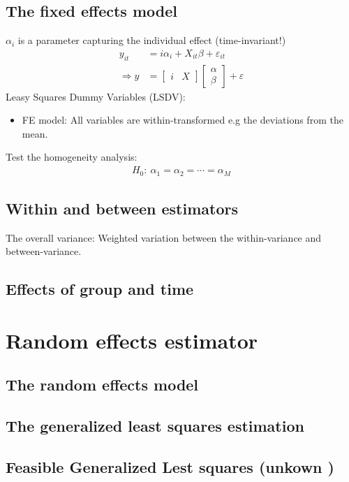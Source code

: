 \begin{multicols}{2}
 \subsection{The fixed effects model}
 $\alpha_i$ is a parameter capturing the individual effect (time-invariant!)
 \begin{align*}
  y_{it}        & =i\alpha_i+X_{it}\beta+\varepsilon_{it}                                            \\
  \Rightarrow y & = [\begin{array}{cc}i & X\end{array}] \left[\begin{array}{c}\alpha \\ \beta\end{array}\right] + \varepsilon
 \end{align*}
 Leasy Squares Dummy Variables (LSDV):
 \begin{itemize}
  \item FE model: All variables are within-transformed e.g the deviations from the mean.
 \end{itemize}
 Test the homogeneity analysis:
 \begin{align*}
  H_0:\ \alpha_1=\alpha_2=\cdots=\alpha_M
 \end{align*}


 \subsection{Within and between estimators}
 The overall variance: Weighted variation between the within-variance and between-variance.


 \subsection{Effects of group and time}


\end{multicols}

\section{Random effects estimator} %
\begin{multicols}{2}
 \subsection{The random effects model}


 \subsection{The generalized least squares estimation}


 \subsection{Feasible Generalized Lest squares (unkown )}



\end{multicols}


